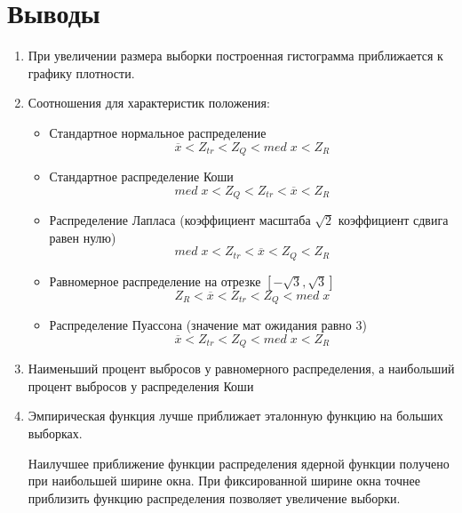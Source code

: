 \documentclass[a4]{article}
\begin{document}
\section{Выводы}
\begin{enumerate}
\item При увеличении размера выборки построенная гистограмма приближается к графику плотности. 
\item Соотношения для характеристик положения:
	\begin{itemize}
    \item Стандартное нормальное распределение $$\overline{x} < Z_{tr} < Z_Q < med\;x < Z_R$$
    
    \item Стандартное распределение Коши $$med\;x < Z_Q < Z_{tr} < \overline{x} < Z_R$$
    
    \item Распределение Лапласа (коэффициент масштаба $\sqrt{2}$ коэффициент сдвига равен нулю) $$med\;x < Z_{tr} < \overline{x} < Z_Q < Z_R$$
    
    \item Равномерное распределение на отрезке $\left[-\sqrt{3},\sqrt{3}\right]$ $$Z_R < \overline{x} < Z_{tr} < Z_Q < med\;x$$
    
    \item Распределение Пуассона (значение мат ожидания равно $3$) $$\overline{x} < Z_{tr} < Z_Q < med\;x < Z_R$$
    
	\end{itemize}
\item Наименьший процент выбросов у равномерного распределения, а наибольший процент выбросов у распределения Коши
\item Эмпирическая функция лучше приближает эталонную функцию на больших выборках.

Наилучшее приближение функции распределения ядерной функции получено при наибольшей ширине окна. При фиксированной ширине окна точнее приблизить функцию распределения позволяет увеличение выборки.
\end{enumerate}
\newpage
\end{document}
